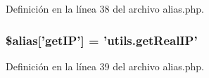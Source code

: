 Definición en la línea 38 del archivo alias.\-php.

\hypertarget{alias_8php_a72c9aa42fb63c2f6cff1c4dd5dabe89d}{
\subsubsection[{\$alias}]{\setlength{\rightskip}{0pt plus 5cm}\$alias\mbox{[}'get\-I\-P'\mbox{]} = '{\bf utils.\-get\-Real\-I\-P}'}}\label{alias_8php_a72c9aa42fb63c2f6cff1c4dd5dabe89d}


Definición en la línea 39 del archivo alias.\-php.


